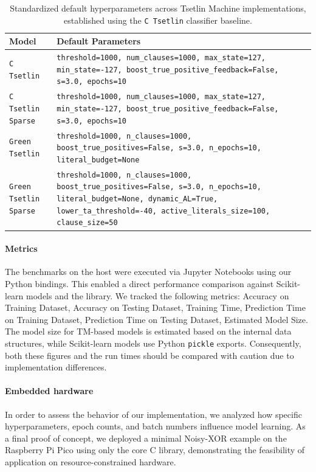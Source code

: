 \begin{table}[!htbp]
\centering
\caption[Tsetlin Machine default parameters]{Standardized default hyperparameters across Tsetlin Machine implementations, established using the \texttt{C Tsetlin} classifier baseline\label{tab:tm-default-params}.}
\begin{tabularx}{\textwidth}{@{}l L@{}} \toprule
    \textbf{Model} & \textbf{Default Parameters} \\ \midrule \midrule
    \texttt{C Tsetlin} & \texttt{threshold=1000, num\_clauses=1000, max\_state=127, min\_state=-127, boost\_true\_positive\_feedback=False, s=3.0, epochs=10} \\ \midrule
    \texttt{C Tsetlin Sparse} & \texttt{threshold=1000, num\_clauses=1000, max\_state=127, min\_state=-127, boost\_true\_positive\_feedback=False, s=3.0, epochs=10} \\ \midrule
    \texttt{Green Tsetlin} & \texttt{threshold=1000, n\_clauses=1000, boost\_true\_positives=False, s=3.0, n\_epochs=10, literal\_budget=None} \\ \midrule
    \texttt{Green Tsetlin Sparse} & \texttt{threshold=1000, n\_clauses=1000, boost\_true\_positives=False, s=3.0, n\_epochs=10, literal\_budget=None, dynamic\_AL=True, lower\_ta\_threshold=-40, active\_literals\_size=100, clause\_size=50} \\ \bottomrule
\end{tabularx}
\end{table}

\paragraph{Metrics}
The benchmarks on the host were executed via Jupyter Notebooks using our Python bindings. This enabled a direct performance comparison against Scikit-learn models and the \GreenTsetlinName library. We tracked the following metrics: Accuracy on Training Dataset, Accuracy on Testing Dataset, Training Time, Prediction Time on Training Dataset, Prediction Time on Testing Dataset, Estimated Model Size. The model size for TM-based models is estimated based on the internal data structures, while Scikit-learn models use Python \texttt{pickle} exports. Consequently, both these figures and the run times should be compared with caution due to implementation differences.

\paragraph{Embedded hardware}
In order to assess the behavior of our implementation, we analyzed how specific hyperparameters, epoch counts, and batch numbers influence model learning. As a final proof of concept, we deployed a minimal Noisy-XOR example on the Raspberry Pi Pico using only the core C library, demonstrating the feasibility of application on resource-constrained hardware.

